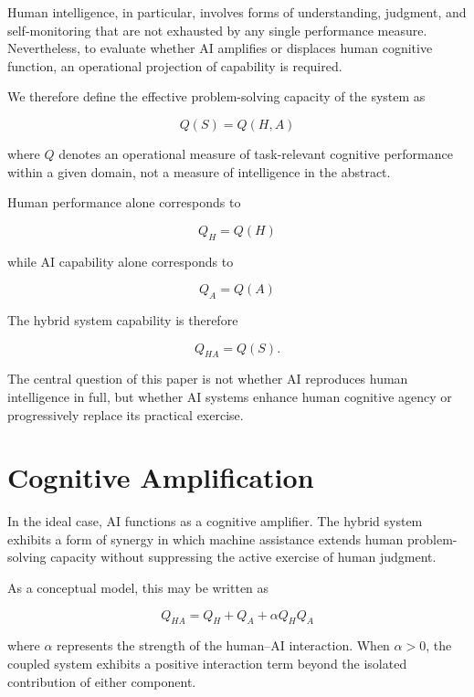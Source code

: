 \documentclass[11pt]{article}
\begin{document}
Human intelligence, in particular, involves forms of understanding,
judgment, and self-monitoring that are not exhausted by any single
performance measure. Nevertheless, to evaluate whether AI amplifies
or displaces human cognitive function, an operational projection of
capability is required.

We therefore define the effective problem-solving capacity of the
system as

\begin{equation}
Q(S) = Q(H,A)
\end{equation}

where $Q$ denotes an operational measure of task-relevant cognitive
performance within a given domain, not a measure of intelligence in
the abstract.

Human performance alone corresponds to

\begin{equation}
Q_H = Q(H)
\end{equation}

while AI capability alone corresponds to

\begin{equation}
Q_A = Q(A)
\end{equation}

The hybrid system capability is therefore

\begin{equation}
Q_{HA} = Q(S).
\end{equation}

The central question of this paper is not whether AI reproduces human
intelligence in full, but whether AI systems enhance human cognitive
agency or progressively replace its practical exercise.


\section{Cognitive Amplification}

In the ideal case, AI functions as a cognitive amplifier. The hybrid
system exhibits a form of synergy in which machine assistance extends
human problem-solving capacity without suppressing the active exercise
of human judgment.

As a conceptual model, this may be written as

\begin{equation}
Q_{HA} = Q_H + Q_A + \alpha Q_H Q_A
\end{equation}

where $\alpha$ represents the strength of the human--AI interaction.
When $\alpha > 0$, the coupled system exhibits a positive interaction
term beyond the isolated contribution of either component.
\end{document}
